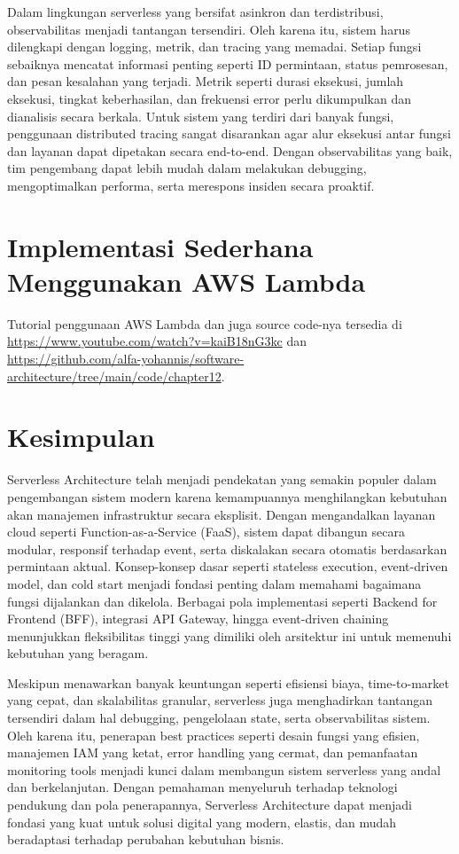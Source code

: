 Dalam lingkungan serverless yang bersifat asinkron dan terdistribusi, observabilitas menjadi tantangan tersendiri. Oleh karena itu, sistem harus dilengkapi dengan logging, metrik, dan tracing yang memadai. Setiap fungsi sebaiknya mencatat informasi penting seperti ID permintaan, status pemrosesan, dan pesan kesalahan yang terjadi. Metrik seperti durasi eksekusi, jumlah eksekusi, tingkat keberhasilan, dan frekuensi error perlu dikumpulkan dan dianalisis secara berkala. Untuk sistem yang terdiri dari banyak fungsi, penggunaan distributed tracing sangat disarankan agar alur eksekusi antar fungsi dan layanan dapat dipetakan secara end-to-end. Dengan observabilitas yang baik, tim pengembang dapat lebih mudah dalam melakukan debugging, mengoptimalkan performa, serta merespons insiden secara proaktif.



\section{Implementasi Sederhana Menggunakan AWS Lambda}

Tutorial penggunaan AWS Lambda dan juga source code-nya tersedia di \url{https://www.youtube.com/watch?v=kaiB18nG3kc} dan\\
\url{https://github.com/alfa-yohannis/software-architecture/tree/main/code/chapter12}.

\section{Kesimpulan}

Serverless Architecture telah menjadi pendekatan yang semakin populer dalam pengembangan sistem modern karena kemampuannya menghilangkan kebutuhan akan manajemen infrastruktur secara eksplisit. Dengan mengandalkan layanan cloud seperti Function-as-a-Service (FaaS), sistem dapat dibangun secara modular, responsif terhadap event, serta diskalakan secara otomatis berdasarkan permintaan aktual. Konsep-konsep dasar seperti stateless execution, event-driven model, dan cold start menjadi fondasi penting dalam memahami bagaimana fungsi dijalankan dan dikelola. Berbagai pola implementasi seperti Backend for Frontend (BFF), integrasi API Gateway, hingga event-driven chaining menunjukkan fleksibilitas tinggi yang dimiliki oleh arsitektur ini untuk memenuhi kebutuhan yang beragam.

Meskipun menawarkan banyak keuntungan seperti efisiensi biaya, time-to-market yang cepat, dan skalabilitas granular, serverless juga menghadirkan tantangan tersendiri dalam hal debugging, pengelolaan state, serta observabilitas sistem. Oleh karena itu, penerapan best practices seperti desain fungsi yang efisien, manajemen IAM yang ketat, error handling yang cermat, dan pemanfaatan monitoring tools menjadi kunci dalam membangun sistem serverless yang andal dan berkelanjutan. Dengan pemahaman menyeluruh terhadap teknologi pendukung dan pola penerapannya, Serverless Architecture dapat menjadi fondasi yang kuat untuk solusi digital yang modern, elastis, dan mudah beradaptasi terhadap perubahan kebutuhan bisnis.
